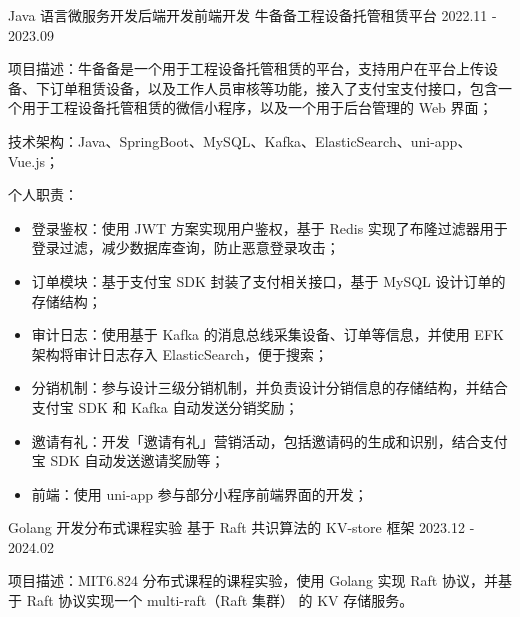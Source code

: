 \begin{cventries}
  \cventry
    {Java 语言微服务开发{\enskip\cdotp\enskip}后端开发{\enskip\cdotp\enskip}前端开发} %
    {牛备备工程设备托管租赁平台} %
    {2022.11 - 2023.09} %
    {} %
    {
      \begin{cvitems}
        \item {项目描述：牛备备是一个用于工程设备托管租赁的平台，支持用户在平台上传设备、下订单租赁设备，以及工作人员审核等功能，接入了支付宝支付接口，包含一个用于工程设备托管租赁的微信小程序，以及一个用于后台管理的 Web 界面；}
        \item {技术架构：Java、SpringBoot、MySQL、Kafka、ElasticSearch、uni-app、Vue.js；}
        \item {个人职责：}
          \begin{itemize}
            \item {登录鉴权：使用 JWT 方案实现用户鉴权，基于 Redis 实现了布隆过滤器用于登录过滤，减少数据库查询，防止恶意登录攻击；}
            \item {订单模块：基于支付宝 SDK 封装了支付相关接口，基于 MySQL 设计订单的存储结构；}
            \item {审计日志：使用基于 Kafka 的消息总线采集设备、订单等信息，并使用 EFK 架构将审计日志存入 ElasticSearch，便于搜索；}
            \item {分销机制：参与设计三级分销机制，并负责设计分销信息的存储结构，并结合支付宝 SDK 和 Kafka 自动发送分销奖励；}
            \item {邀请有礼：开发「邀请有礼」营销活动，包括邀请码的生成和识别，结合支付宝 SDK 自动发送邀请奖励等；}
            \item {前端：使用 uni-app 参与部分小程序前端界面的开发；}
          \end{itemize}
      \end{cvitems}
    }

  \cventry
    {Golang 开发{\enskip\cdotp\enskip}分布式课程实验} %
    {基于 Raft 共识算法的 KV-store 框架} %
    {2023.12 - 2024.02} %
    {} %
    {
      \begin{cvitems}
        \item {项目描述：MIT6.824 分布式课程的课程实验，使用 Golang 实现 Raft 协议，并基于 Raft 协议实现一个 multi-raft（Raft 集群） 的 KV 存储服务。}
      \end{cvitems}
    }


\end{cventries}
